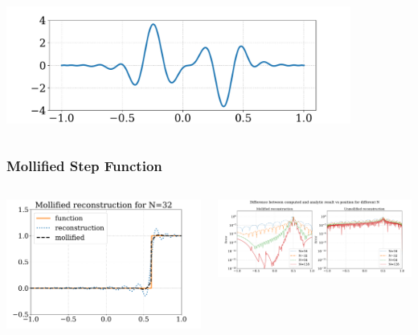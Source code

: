 \documentclass[9pt,usepdftitle=false,aspectratio=169]{beamer}
\begin{document}
\begin{frame}
\begin{columns}
\begin{column}{0.5\textwidth}
\begin{center}
        \includegraphics[width=0.85\textwidth]{jump_expon}\\
      \end{center}
    \end{column}
  \end{columns}
\end{frame}

\begin{frame}
  \frametitle{Mollified Step Function}
  \begin{columns}
    \begin{column}{0.4\textwidth}
      \centering
      \includegraphics[width=\textwidth]{mollifiedN32_edge}
    \end{column}
    \begin{column}{0.7\textwidth}
      \centering
      \includegraphics[width=\textwidth]{mollified_unmollified}
    \end{column}
  \end{columns}
\end{frame}
\end{document}
